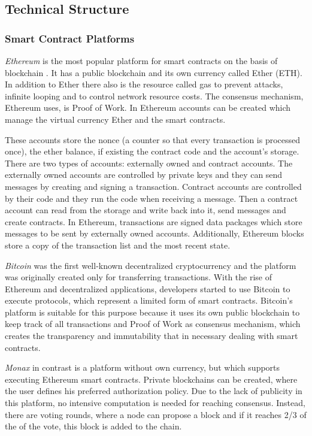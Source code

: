 \documentclass[conference]{IEEEtran}
\begin{document}
\subsection{Technical Structure}

\subsubsection{Smart Contract Platforms}
\textit{Ethereum} is the most popular platform for smart contracts on the basis of blockchain \cite{Meitinger2017}. It has a public blockchain and its own currency called Ether (ETH). In addition to Ether there also is the resource called gas to prevent attacks, infinite looping and to control network resource costs. The consensus mechanism, Ethereum uses, is Proof of Work. In Ethereum accounts can be created which manage the virtual currency Ether and the smart contracts. \cite{Bartoletti2017} \cite{Zhang2016} \par These accounts store the nonce (a counter so that every transaction is processed once), the ether balance, if existing the contract code and the account's storage. There are two types of accounts: externally owned and contract accounts. The externally owned accounts are controlled by private keys and they can send messages by creating and signing a transaction. Contract accounts are controlled by their code and they run the code when receiving a message. Then a contract account can read from the storage and write back into it, send messages and create contracts. In Ethereum, transactions are signed data packages which store messages to be sent by externally owned accounts. Additionally, Ethereum blocks store a copy of the transaction list and the most recent state. \cite{Buterin2014}  \par
\textit{Bitcoin} was the first well-known decentralized cryptocurrency and the platform was originally created only for transferring transactions. With the rise of Ethereum and decentralized applications, developers started to use Bitcoin to execute protocols, which represent a limited form of smart contracts. Bitcoin's platform is suitable for this purpose because it uses its own public blockchain to keep track of all transactions and Proof of Work as consensus mechanism, which creates the transparency and immutability that in necessary dealing with smart contracts. \cite{Bartoletti2017} \par 
\textit{Monax} in contrast is a platform without own currency, but which supports executing Ethereum smart contracts. Private blockchains can be created, where the user defines his preferred authorization policy. Due to the lack of publicity in this platform, no intensive computation is needed for reaching consensus. Instead, there are voting rounds, where a node can propose a block and if it reaches 2/3 of the of the vote, this block is added to the chain. \cite{Bartoletti2017} \par 
\end{document}
